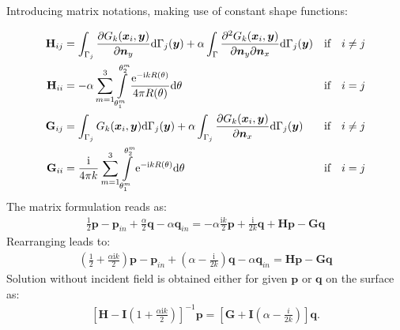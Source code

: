\documentclass[a4paper, 10pt]{article}
\newcommand{\te}{\mathrm{e}}
\newcommand{\ti}{\mathrm{i}}
\newcommand{\td}{\mathrm{d}}
\newcommand{\sx}{\bm{\mathnormal{x}}}
\newcommand{\sy}{\bm{\mathnormal{y}}}
\newcommand{\sn}{\bm{\mathnormal{n}}}
\newcommand{\bp}{\mathbf{p}}
\newcommand{\bq}{\mathbf{q}}
\newcommand{\bH}{\mathbf{H}}
\newcommand{\bG}{\mathbf{G}}
\newcommand{\bI}{\mathbf{I}}
\newcommand{\summ}{\sum\limits_{m=1}^3}
\newcommand{\intms}{\int\limits_{\theta_1^m}^{\theta_2^m}}
\begin{document}
Introducing matrix notations, making use of constant shape functions:

\begin{align}
	\bH_{ij}
	& = \int_{\Gamma_j}\frac{\partial{G}_k (\sx_i, \sy)}{\partial \sn_y} \td \Gamma_j(\sy)
	+ \alpha \int_\Gamma \frac{\partial^2{G}_k (\sx_i, \sy)}{\partial \sn_y \partial \sn_x} \td \Gamma_j(\sy)
	& \text{if} \quad i \ne j \nonumber \\
	\bH_{ii}
	& = - \alpha \summ \intms \frac{\te ^{-\ti k R(\theta)}}{4 \pi R(\theta)} \mathrm{d} \theta 
	& \text{if} \quad i = j \nonumber \\
	\bG_{ij}
	& = \int_{\Gamma_j} G_k(\sx_i,\sy) \td \Gamma_j(\sy)
	+ \alpha \int_{\Gamma_j} \frac{\partial{G}_k (\sx_i, \sy)}{\partial \sn_x} \td \Gamma_j(\sy)
	& \text{if} \quad i \ne j \nonumber \\
	\bG_{ii}
	& = \frac{\ti}{4\pi k}\summ \intms \te ^{-\ti kR(\theta)} \mathrm{d} \theta 
	& \text{if} \quad i = j
\end{align}
%
The matrix formulation reads as:
%
\begin{align}
	\frac{1}{2} \mathbf{p} - \mathbf{p}_{in} + \frac{\alpha}{2} \mathbf{q} - \alpha \mathbf{q}_{in} = - \alpha \frac{\ti k}{2} \bp 
	+ \frac{\ti }{2k} \bq + \bH \bp - \bG \bq
\end{align}
%
Rearranging leads to:
%
\begin{align}
	\left(\frac{1}{2} + \frac{\alpha \ti k}{2}\right)\bp - \bp_{in}+ \left(\alpha - \frac{\ti }{2 k}\right) \bq - \alpha \bq_{in} =\bH \bp - \bG \bq
\end{align}
%
Solution without incident field is obtained either for given $\bp$ or $\bq$ on the surface as:
%
\begin{align}
	\left[\bH - \bI\left(1 + \frac{\alpha \ti k}{2}\right) \right]^{-1} \bp = \left[\bG + \bI \left(\alpha - \frac{i}{2k}\right) \right] \bq .
\end{align}
\end{document}
